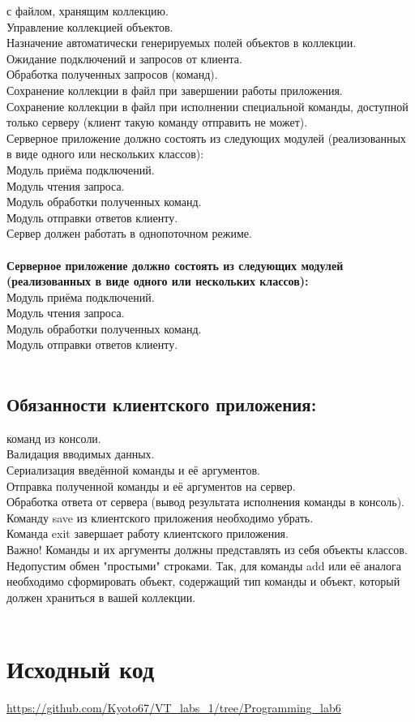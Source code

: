  с файлом, хранящим коллекцию.\\
Управление коллекцией объектов.\\
Назначение автоматически генерируемых полей объектов в коллекции.\\
Ожидание подключений и запросов от клиента.\\
Обработка полученных запросов (команд).\\
Сохранение коллекции в файл при завершении работы приложения.\\
Сохранение коллекции в файл при исполнении специальной команды, доступной только серверу (клиент такую команду отправить не может).\\
Серверное приложение должно состоять из следующих модулей (реализованных в виде одного или нескольких классов):\\
Модуль приёма подключений.\\
Модуль чтения запроса.\\
Модуль обработки полученных команд.\\
Модуль отправки ответов клиенту.\\
Сервер должен работать в однопоточном режиме.\\
\\
\textbf{Серверное приложение должно состоять из следующих модулей (реализованных в виде одного или нескольких классов):\\}
Модуль приёма подключений.\\
Модуль чтения запроса.\\
Модуль обработки полученных команд.\\
Модуль отправки ответов клиенту.\\
\\
\subsection{Обязанности клиентского приложения:}

 команд из консоли.\\
Валидация вводимых данных.\\
Сериализация введённой команды и её аргументов.\\
Отправка полученной команды и её аргументов на сервер.\\
Обработка ответа от сервера (вывод результата исполнения команды в консоль).\\
Команду save из клиентского приложения необходимо убрать.\\
Команда exit завершает работу клиентского приложения.\\
Важно! Команды и их аргументы должны представлять из себя объекты классов. Недопустим обмен "простыми" строками. Так, для команды add или её аналога необходимо сформировать объект, содержащий тип команды и объект, который должен храниться в вашей коллекции.\\
\\
\section{Исходный код}
\url{https://github.com/Kyoto67/VT_labs_1/tree/Programming_lab6}